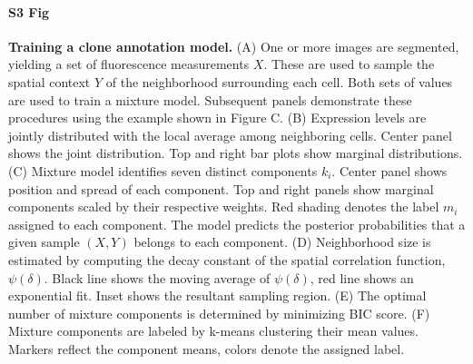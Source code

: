 \documentclass[10pt,letterpaper]{article}
\begin{document}
\paragraph*{S3 Fig}
\label{S3_Fig}
{\bf Training a clone annotation model.} (A) One or more images are segmented, yielding a set of fluorescence measurements $X$. These are used to sample the spatial context $Y$ of the neighborhood surrounding each cell. Both sets of values are used to train a mixture model. Subsequent panels demonstrate these procedures using the example shown in Figure C. (B) Expression levels are jointly distributed with the local average among neighboring cells. Center panel shows the joint distribution. Top and right bar plots show marginal distributions. (C) Mixture model identifies seven distinct components $k_i$. Center panel shows position and spread of each component. Top and right panels show marginal components scaled by their respective weights. Red shading denotes the label $m_i$ assigned to each component. The model predicts the posterior probabilities that a given sample $(X,Y)$ belongs to each component. (D) Neighborhood size is estimated by computing the decay constant of the spatial correlation function, $\psi(\delta)$. Black line shows the moving average of $\psi(\delta)$, red line shows an exponential fit. Inset shows the resultant sampling region. (E) The optimal number of mixture components is determined by minimizing BIC score. (F) Mixture components are labeled by k-means clustering their mean values. Markers reflect the component means, colors denote the assigned label.
\end{document}
